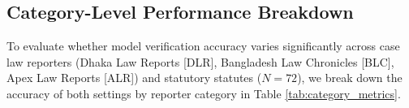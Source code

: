 \documentclass[conference]{IEEEtran}
\begin{document}
\begin{table}[!t]
\caption{Pre-Registered Statistical Hypotheses Testing ($\alpha=0.05$)}
\label{tab:stats}
\centering
\renewcommand{\arraystretch}{1.08}
\end{table}

\subsection{Category-Level Performance Breakdown}
To evaluate whether model verification accuracy varies significantly across case law reporters (Dhaka Law Reports [DLR], Bangladesh Law Chronicles [BLC], Apex Law Reports [ALR]) and statutory statutes ($N=72$), we break down the accuracy of both settings by reporter category in Table \ref{tab:category_metrics}.
\end{document}
